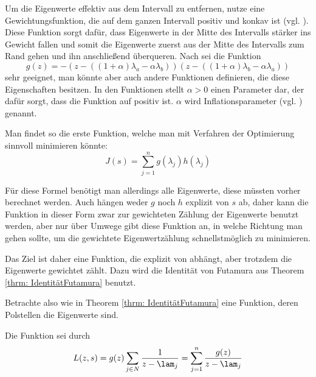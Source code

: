 \documentclass[a4paper,12pt]{report}
\newcommand{\1}{\mathds{1}}
\theoremstyle{plain} %
\theoremstyle{definition} %
\theoremstyle{remark}
\begin{document}
            Um die Eigenwerte effektiv aus dem Intervall zu entfernen, nutze eine Gewichtungsfunktion, die auf dem ganzen Intervall positiv und konkav ist (vgl. \cite[S. 3]{hauptteilTkachuk}).
            Diese Funktion sorgt dafür, dass Eigenwerte in der Mitte des Intervalls stärker ins Gewicht fallen
            und somit die Eigenwerte zuerst aus der Mitte des Intervalls zum Rand gehen und ihn anschließend überqueren.
            Nach \cite[S. 3]{hauptteilTkachuk} sei die Funktion
            $$g(z) = -(z-((1+\alpha)\lambda_a -\alpha\lambda_b))(z-((1+\alpha)\lambda_b-\alpha\lambda_a))$$
            sehr geeignet, man könnte aber auch andere Funktionen definieren, die diese Eigenschaften besitzen.
            In den Funktionen stellt $\alpha>0$ einen Parameter dar, der dafür sorgt, dass die Funktion auf \lamAlamB positiv ist.
            $\alpha$ wird Inflationsparameter (vgl. \cite[S. 3]{hauptteilTkachuk}) genannt.

            Man findet so die erste Funktion, welche man mit Verfahren der Optimierung sinnvoll minimieren könnte:
            \begin{equation}
                  \label{def: J original}
                  J(s) = \sum_{j=1}^n g(\lambda_j)h(\lambda_j)
            \end{equation}

            Für diese Formel benötigt man allerdings alle Eigenwerte, diese müssten vorher berechnet werden.
            Auch hängen weder $g$ noch $h$ explizit von $s$ ab, daher kann die Funktion \J in dieser Form zwar zur gewichteten Zählung der Eigenwerte benutzt werden,
            aber nur über Umwege gibt diese Funktion an, in welche Richtung man gehen sollte, um die gewichtete Eigenwertzählung schnellstmöglich zu minimieren.
            
            Das Ziel ist daher eine Funktion, die explizit von \s abhängt, aber trotzdem die Eigenwerte gewichtet zählt.
            Dazu wird die Identität von Futamura aus Theorem \ref{thrm: IdentitätFutamura} benutzt.

            Betrachte also wie in Theorem \ref{thrm: IdentitätFutamura} eine Funktion, deren Polstellen die Eigenwerte sind.

            Die Funktion sei durch
            \begin{equation}
                  \label{eqn: ZielfunktionMitPolstellen}
                  L(z, s) = g(z)\sum_{j\in N} \frac{1}{z-\lam_j} = \sum_{j=1}^n \frac{g(z)}{z-\lam_j}
            \end{equation}
\end{document}
